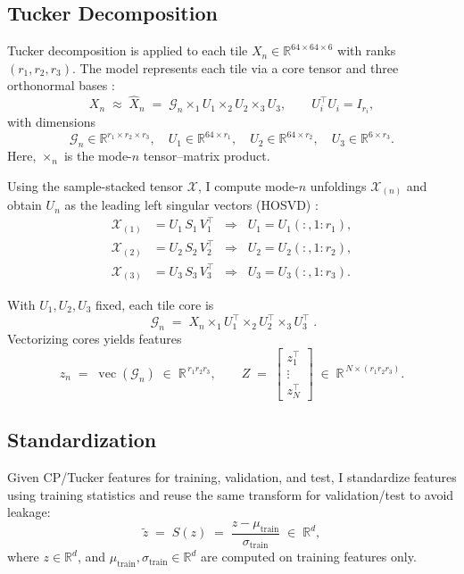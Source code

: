 \documentclass[11pt]{article}
\newcommand{\R}{\mathbb{R}}
\begin{document}
\subsection{Tucker Decomposition}

Tucker decomposition is applied to each tile \(X_n \in \R^{64\times 64\times 6}\) with ranks \((r_1,r_2,r_3)\).
The model represents each tile via a core tensor and three orthonormal bases \parencite{Tucker1966,KoldaBader2009}:
\[
X_n \;\approx\; \hat X_n \;=\; \mathcal{G}_n \times_{1} U_1 \times_{2} U_2 \times_{3} U_3,
\qquad U_i^\top U_i = I_{r_i},
\]
with dimensions
\[
\mathcal{G}_n \in \R^{r_1\times r_2\times r_3},\quad
U_1 \in \R^{64\times r_1},\quad
U_2 \in \R^{64\times r_2},\quad
U_3 \in \R^{6\times r_3}.
\]
Here, \(\times_n\) is the mode-\(n\) tensor--matrix product.

\noindent Using the sample-stacked tensor \(\mathcal{X}\), I compute mode-\(n\) unfoldings \(\mathcal{X}_{(n)}\) and obtain \(U_n\) as the leading left singular vectors (HOSVD) \parencite{DeLathauwer2000a}:
\[
\begin{aligned}
\mathcal{X}_{(1)} &= U_1\,S_1\,V_1^\top \;\;\Rightarrow\;\; U_1 = U_1(:,1{:}r_1),\\[4pt]
\mathcal{X}_{(2)} &= U_2\,S_2\,V_2^\top \;\;\Rightarrow\;\; U_2 = U_2(:,1{:}r_2),\\[4pt]
\mathcal{X}_{(3)} &= U_3\,S_3\,V_3^\top \;\;\Rightarrow\;\; U_3 = U_3(:,1{:}r_3).
\end{aligned}
\]

\noindent With \(U_1,U_2,U_3\) fixed, each tile core is
\[
\boxed{\;\mathcal{G}_n \;=\; X_n \times_{1} U_1^{\top} \times_{2} U_2^{\top} \times_{3} U_3^{\top}\; }.
\]
Vectorizing cores yields features
\[
z_n \;=\; \operatorname{vec}(\mathcal{G}_n) \;\in\; \R^{\,r_1 r_2 r_3},\qquad
Z \;=\; \begin{bmatrix} z_1^\top \\ \vdots \\ z_N^\top \end{bmatrix}
\;\in\; \R^{\,N \times (r_1 r_2 r_3)}.
\]

\subsection{Standardization}

Given CP/Tucker features for training, validation, and test, I standardize features using training statistics and reuse the same transform for validation/test to avoid leakage:
\[
\tilde{z} \;=\; S(z) \;=\; \frac{z - \mu_{\text{train}}}{\sigma_{\text{train}}} \;\in\; \R^{d},
\]
where \(z\in\R^{d}\), and \(\mu_{\text{train}},\sigma_{\text{train}}\in\R^{d}\) are computed on training features only.
\end{document}
